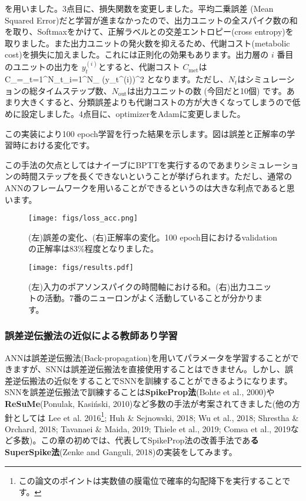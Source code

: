 を用いました。3点目に、損失関数を変更しました。平均二乗誤差 (Mean Squared Error)だと学習が進まなかったので、出力ユニットの全スパイク数の和を取り、Softmaxをかけて、正解ラベルとの交差エントロピー(cross entropy)を取りました。また出力ユニットの発火数を抑えるため、代謝コスト(metabolic cost)を損失に加えました。これには正則化の効果もあります。出力層の $i$ 番目のユニットの出力を $y_t^{(i)}$とすると、代謝コスト $C_{\text{met}}$は 
C_{}=\sum_{t=1}^{N_t}\sum_{i=1}^{N_{}} \left(y_t^{(i)}\right)^2 
となります。ただし、$N_t$はシミュレーションの総タイムステップ数、$N_{\text{out}}$は出力ユニットの数 (今回だと10個) です。あまり大きくすると、分類誤差よりも代謝コストの方が大きくなってしまうので低めに設定しました。4点目に、optimizerをAdamに変更しました。\par
この実装により100 epoch学習を行った結果を示します。図は誤差と正解率の学習時における変化です。\par
この手法の欠点としてはナイーブにBPTTを実行するのであまりシミュレーションの時間ステップを長くできないということが挙げられます。ただし、通常のANNのフレームワークを用いることができるというのは大きな利点であると思います。
\begin{figure}[htbp]
    \centering
    \texttt{[image: figs/loss\_acc.png]}
    \caption{(左)誤差の変化、(右)正解率の変化。100 epoch目におけるvalidationの正解率は83\%程度となりました。}
    \label{fig:snu_1}
\end{figure}
\begin{figure}[htbp]
    \centering
    \texttt{[image: figs/results.pdf]}
    \caption{(左)入力のポアソンスパイクの時間軸における和。(右)出力ユニットの活動。7番のニューロンがよく活動していることが分かります。}
    \label{fig:snu_2}
\end{figure}


\subsubsection{誤差逆伝搬法の近似による教師あり学習}

ANNは誤差逆伝搬法(Back-propagation)を用いてパラメータを学習することができますが、SNNは誤差逆伝搬法を直接使用することはできません。しかし、誤差逆伝搬法の近似をすることでSNNを訓練することができるようになります。SNNを誤差逆伝搬法で訓練することは\textbf{SpikeProp法}(Bohte et al., 2000)や\textbf{ReSuMe}(Ponulak, Kasiński, 2010)など多数の手法が考案されてきました(他の方針としては Lee et al. 2016\footnote{この論文のポイントは実数値の膜電位で確率的勾配降下を実行することです。}; Huh \& Sejnowski, 2018; Wu et al., 2018; Shrestha \& Orchard, 2018; Tavanaei \& Maida, 2019; Thiele et al., 2019; Comsa et al., 2019など多数)。この章の初めでは、代表してSpikeProp法の改善手法であ\textbf{るSuperSpike法}(Zenke and Ganguli, 2018)の実装をしてみます。
